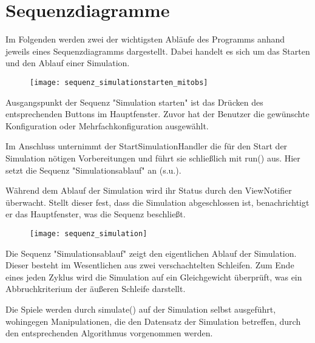 \section{Sequenzdiagramme}

Im Folgenden werden zwei der wichtigsten Abläufe des Programms anhand jeweils eines Sequenzdiagramms dargestellt.
Dabei handelt es sich um das Starten und den Ablauf einer Simulation.

\begin{figure}[H]
{\centering 
\texttt{[image: sequenz\_simulationstarten\_mitobs]}}
\bigskip
\end{figure}

Ausgangspunkt der Sequenz "Simulation starten" ist das Drücken des entsprechenden Buttons im Hauptfenster. Zuvor hat der Benutzer die gewünschte Konfiguration oder Mehrfachkonfiguration ausgewählt.

Im Anschluss unternimmt der StartSimulationHandler die für den Start der Simulation nötigen Vorbereitungen und führt sie schließlich mit run() aus.
Hier setzt die Sequenz "Simulationsablauf" an (s.u.).

Während dem Ablauf der Simulation wird ihr Status durch den ViewNotifier überwacht. Stellt dieser fest, dass die Simulation abgeschlossen ist, benachrichtigt er das Hauptfenster, was die Sequenz beschließt.


\begin{figure}[H]
{\centering 
\texttt{[image: sequenz\_simulation]}}
\bigskip
\end{figure}

Die Sequenz "Simulationsablauf" zeigt den eigentlichen Ablauf der Simulation. Dieser besteht im Wesentlichen aus zwei verschachtelten Schleifen. Zum Ende eines jeden Zyklus wird die Simulation auf ein Gleichgewicht überprüft, was ein Abbruchkriterium der äußeren Schleife darstellt.

Die Spiele werden durch simulate() auf der Simulation selbst ausgeführt, wohingegen Manipulationen, die den Datensatz der Simulation betreffen, durch den entsprechenden Algorithmus vorgenommen werden.





